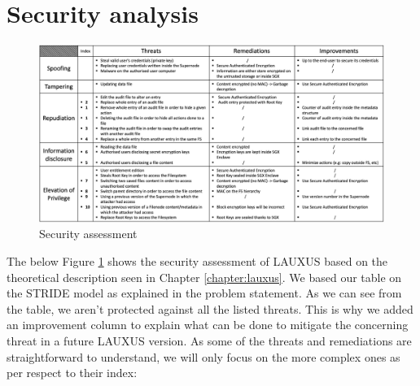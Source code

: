 \documentclass[../main.tex]{subfiles}
\begin{document}
\section{Security analysis}
\label{section:analysis:theoric_performance}
\begin{figure}[H!]
    \centering
    \includegraphics[angle=90,width=.88\textwidth,keepaspectratio]{images/analysis/security_assessment}
    
    \caption{Security assessment}
    \label{figure:analysis:security_assessment}
\end{figure}
\par The below Figure \ref{figure:analysis:security_assessment} shows the security assessment of LAUXUS based on the theoretical description seen in Chapter \ref{chapter:lauxus}. We based our table on the STRIDE model as explained in the problem statement. As we can see from the table, we aren't protected against all the listed threats. This is why we added an improvement column to explain what can be done to mitigate the concerning threat in a future LAUXUS version. As some of the threats and remediations are straightforward to understand, we will only focus on the more complex ones as per respect to their index:
\end{document}

